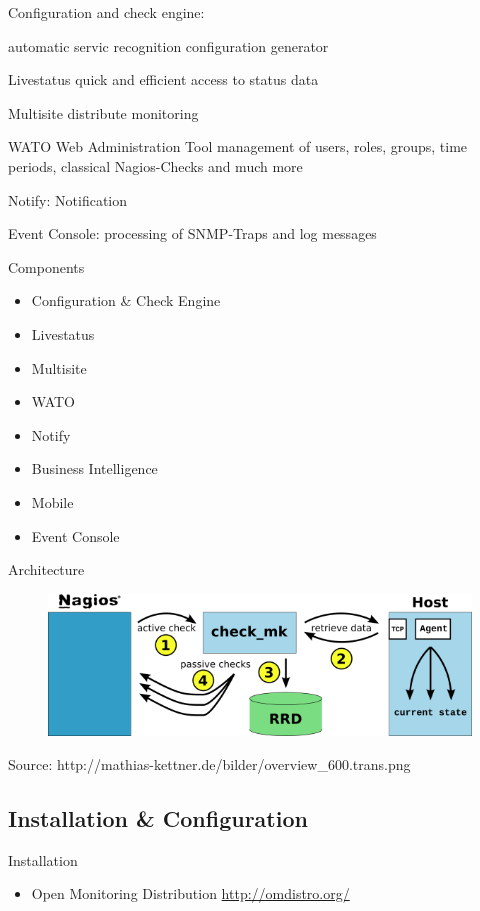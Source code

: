 Configuration and check engine:

automatic servic recognition
configuration generator

Livestatus
quick and efficient access to status data

Multisite
distribute monitoring

WATO
Web Administration Tool
management of users, roles, groups, time periods, 
classical Nagios-Checks and much more

Notify:
Notification

Event Console:
processing of SNMP-Traps and log messages

\begin{frame}[fragile]{Components}
\begin{itemize}
\item Configuration \& Check Engine
\item Livestatus
\item Multisite
\item WATO
\item Notify
\item Business Intelligence
\item Mobile
\item Event Console
\end{itemize}
\end{frame}

\begin{frame}{Architecture}
\begin{figure}
\includegraphics[width=\textwidth]{images/overview_600_trans.png}
\end{figure}
Source: http://mathias-kettner.de/bilder/overview\_600.trans.png
\end{frame}

\subsection{Installation \& Configuration}

\begin{frame}[fragile]{Installation}
\begin{itemize}
\item Open Monitoring Distribution \url{http://omdistro.org/}
\end{itemize}
\end{frame}

